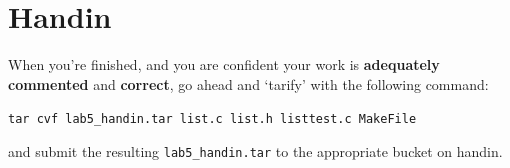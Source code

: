 \documentclass[12pt]{article}
\begin{document}
\section{Handin}

When you're finished, and you are confident your work is \textbf{adequately commented} and \textbf{correct}, go ahead and `tarify' with the following command:
\begin{center}
\texttt{tar cvf lab5\_handin.tar list.c list.h listtest.c MakeFile}
\end{center}
\noindent and submit the resulting \texttt{lab5\_handin.tar} to the appropriate bucket on handin.
\end{document}
